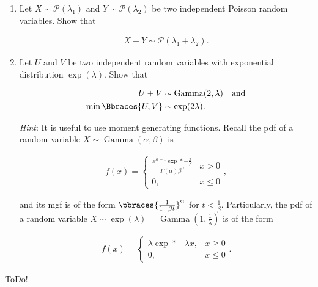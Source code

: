 
\begin{exercise}

\phantom{}

\begin{enumerate}[label = (\alph*)]

    \item Let $X \sim \mathcal P(\lambda_1)$ and $Y \sim \mathcal P(\lambda_2)$ be two independent Poisson random variables.
    Show that

    \begin{align*}
        X + Y \sim \mathcal P(\lambda_1 + \lambda_2).
    \end{align*}

    \item Let $U$ and $V$ be two independent random variables with exponential distribution $\exp(\lambda)$.
    Show that

    \begin{align*}
        U + V
        & \sim
        \operatorname{Gamma}(2, \lambda) \quad \text{and} \\
        \min \Bbraces{U, V}
        & \sim
        \exp(2 \lambda).
    \end{align*}

    \textit{Hint}:
    It is useful to use moment generating functions.
    Recall the pdf of a random variable $X \sim \operatorname{Gamma}(\alpha, \beta)$ is

    \begin{align*}
        f(x)
        =
        \begin{cases}
            \frac{x^{\alpha - 1} \exp*{-\frac{x}{\beta}}}{\Gamma(\alpha) \beta^\alpha}
            & x > 0 \\
            0,
            & x \leq 0
        \end{cases},
    \end{align*}
    
    and its mgf is of the form $\pbraces{\frac{1}{1 - \beta t}}^\alpha$ for $t < \frac{1}{\beta}$.
    Particularly, the pdf of a random variable $X \sim \exp(\lambda) = \operatorname{Gamma}(1, \frac{1}{\lambda})$ is of the form

    \begin{align*}
        f(x)
        =
        \begin{cases}
            \lambda \exp*{-\lambda x},
            & x \geq 0 \\
            0,
            & x \leq 0
        \end{cases}.
    \end{align*}

\end{enumerate}

\end{exercise}


\begin{solution}

ToDo!

\end{solution}

